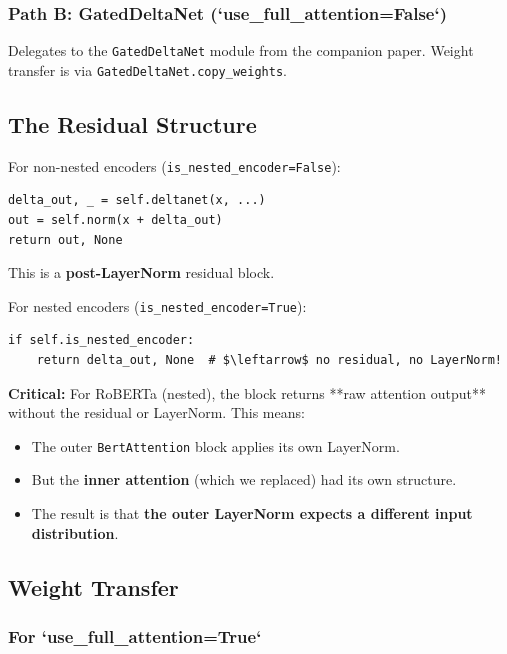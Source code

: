 \subsubsection{Path B: GatedDeltaNet (`use\_full\_attention=False`)}

Delegates to the \texttt{GatedDeltaNet} module from the companion paper. Weight 
transfer is via \texttt{GatedDeltaNet.copy\_weights}.

\subsection{The Residual Structure}

For non-nested encoders (\texttt{is\_nested\_encoder=False}):

\begin{lstlisting}
delta_out, _ = self.deltanet(x, ...)
out = self.norm(x + delta_out)
return out, None
\end{lstlisting}

This is a \textbf{post-LayerNorm} residual block.

For nested encoders (\texttt{is\_nested\_encoder=True}):

\begin{lstlisting}
if self.is_nested_encoder:
    return delta_out, None  # $\leftarrow$ no residual, no LayerNorm!
\end{lstlisting}

\textbf{Critical:} For RoBERTa (nested), the block returns **raw attention 
output** without the residual or LayerNorm. This means:
\begin{itemize}
\item The outer \texttt{BertAttention} block applies its own LayerNorm.
\item But the \textbf{inner attention} (which we replaced) had its own structure.
\item The result is that \textbf{the outer LayerNorm expects a different input distribution}.

\end{itemize}
\subsection{Weight Transfer}

\subsubsection{For `use\_full\_attention=True`}

